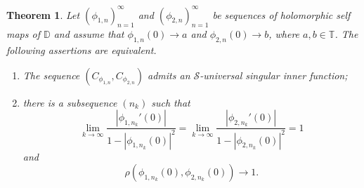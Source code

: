 \documentclass[12pt,a4paper]{amsart}
\theoremstyle{plain}
\newtheorem{theorem}{Theorem}[section]
\theoremstyle{definition}
\theoremstyle{remark}
\theoremstyle{fact}
\begin{document}
     \begin{theorem}\label{singular}
        Let $(\phi_{1, n})_{n=1}^{\infty}$ and $(\phi_{2, n})_{n=1}^{\infty}$ be sequences of holomorphic self maps of $\mathbb{D}$ and assume that $\phi_{1, n}(0)\rightarrow a$ and $\phi_{2, n}(0)\rightarrow b$, where $a, b\in \mathbb{T}$. The following assertions are equivalent.
        \begin{enumerate}
            \item The sequence $(C_{\phi_{1, n}},C_{\phi_{2, n}})$ admits an $\mathcal{S}$-universal singular inner function;
            \item there is a subsequence $(n_k)$ such that
            $$
            \lim_{k\rightarrow \infty}\frac{|\phi_{1, n_k}'(0)|}{1-|\phi_{1, n_k}(0)|^2}=\lim_{k\rightarrow \infty}\frac{|\phi_{2, n_k}'(0)|}{1-|\phi_{2, n_k}(0)|^2}=1
            $$
            and
            $$
            \rho(\phi_{1, n_k}(0),\phi_{2, n_k}(0))\rightarrow 1.
            $$
            \end{enumerate}
    \end{theorem}
\end{document}
